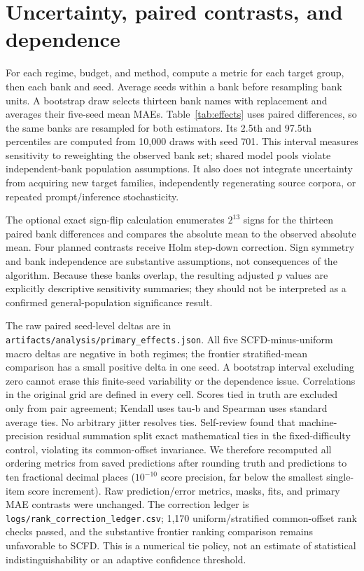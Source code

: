 \section{Uncertainty, paired contrasts, and dependence}\label{app:uncertainty}
For each regime, budget, and method, compute a metric for each target group, then each bank and seed. Average seeds within a bank before resampling bank units. A bootstrap draw selects thirteen bank names with replacement and averages their five-seed mean MAEs. Table~\ref{tab:effects} uses paired differences, so the same banks are resampled for both estimators. Its 2.5th and 97.5th percentiles are computed from 10,000 draws with seed 701. This interval measures sensitivity to reweighting the observed bank set; shared model pools violate independent-bank population assumptions. It also does not integrate uncertainty from acquiring new target families, independently regenerating source corpora, or repeated prompt/inference stochasticity.

The optional exact sign-flip calculation enumerates $2^{13}$ signs for the thirteen paired bank differences and compares the absolute mean to the observed absolute mean. Four planned contrasts receive Holm step-down correction. Sign symmetry and bank independence are substantive assumptions, not consequences of the algorithm. Because these banks overlap, the resulting adjusted $p$ values are explicitly descriptive sensitivity summaries; they should not be interpreted as a confirmed general-population significance result.
\begin{table}[h]
\caption{Prespecified budget-50 SCFD-minus-comparator effects, pp. ``Banks better'' counts strictly negative five-seed bank means. See the dependence qualifications above.}\label{tab:effects}
\centering\small
\end{table}
The raw paired seed-level deltas are in \texttt{artifacts/analysis/primary\_effects.json}. All five SCFD-minus-uniform macro deltas are negative in both regimes; the frontier stratified-mean comparison has a small positive delta in one seed. A bootstrap interval excluding zero cannot erase this finite-seed variability or the dependence issue. Correlations in the original grid are defined in every cell. Scores tied in truth are excluded only from pair agreement; Kendall uses tau-b and Spearman uses standard average ties. No arbitrary jitter resolves ties. Self-review found that machine-precision residual summation split exact mathematical ties in the fixed-difficulty control, violating its common-offset invariance. We therefore recomputed all ordering metrics from saved predictions after rounding truth and predictions to ten fractional decimal places ($10^{-10}$ score precision, far below the smallest single-item score increment). Raw prediction/error metrics, masks, fits, and primary MAE contrasts were unchanged. The correction ledger is \texttt{logs/rank\_correction\_ledger.csv}; 1,170 uniform/stratified common-offset rank checks passed, and the substantive frontier ranking comparison remains unfavorable to SCFD. This is a numerical tie policy, not an estimate of statistical indistinguishability or an adaptive confidence threshold.

